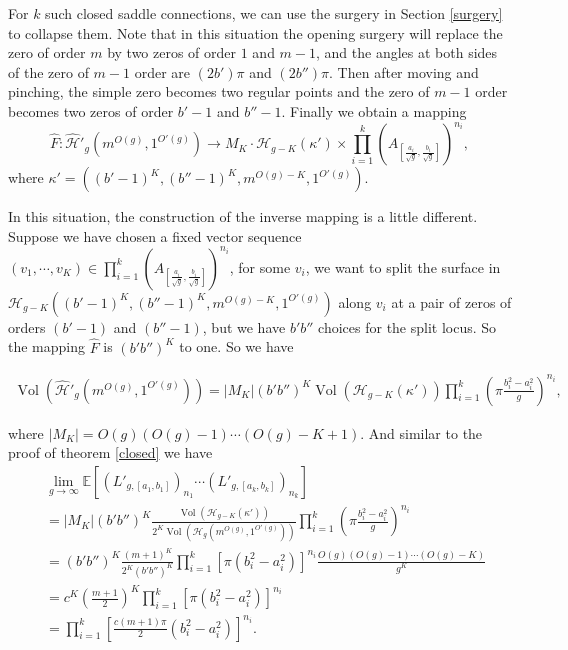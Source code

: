 \documentclass[12pt]{amsart} %
\theoremstyle{definition}
\theoremstyle{remark}
\numberwithin{equation}{section}
\renewcommand\H{{\mathcal H}}
\newcommand{\V}{\operatorname{Vol}}
\begin{document}
For $k$ such closed saddle connections, we can use the surgery in Section \ref{surgery} to collapse them. 
Note that in this situation the opening surgery will replace the zero of order $m$ by two zeros of order $1$ and $m-1$, 
and the angles at both sides of the zero of $m-1$ order are $(2b')\pi$ and $(2b'')\pi$. Then after moving and pinching, 
the simple zero becomes two regular points and the zero of $m-1$ order becomes two zeros of order $b'-1$ and $b''-1$.
Finally we obtain a mapping
$$\hat{F}: \hat{\mathcal{H}}'_{g}(m^{O(g)},1^{O'(g)})\to M_K\cdot \H_{g-K}(\kappa')\times \prod^k_{i=1} (A_{[\frac{a_i}{\sqrt{g}},\frac{b_i}{\sqrt{g}}]})^{n_i},$$
where $\kappa'=((b'-1)^K,(b''-1)^K,m^{O(g)-K},1^{O'(g)})$.

In this situation, the construction of the inverse mapping is a little different.
Suppose we have chosen a fixed vector sequence $(v_1,\cdots,v_K)\in \prod^k_{i=1} (A_{[\frac{a_i}{\sqrt{g}},\frac{b_i}{\sqrt{g}}]})^{n_i}$, 
for some $v_i$, we want to split the surface in $\H_{g-K}((b'-1)^K,(b''-1)^K,m^{O(g)-K},1^{O'(g)})$ along $v_i$ at a pair of zeros of orders $(b'-1)$ and $(b''-1)$,
but we have $b'b''$ choices for the split locus. So the mapping $\hat{F}$ is $(b'b'')^K$ to one.
So we have


\begin{equation*}
\begin{aligned}
\V(\hat{\mathcal{H}}'_{g}(m^{O(g)},1^{O'(g)}))=|M_K|(b'b'')^K \V(\H_{g-K}(\kappa'))\prod^k_{i=1}(\pi \frac{b_i^2-a_i^2}{g})^{n_i},
\end{aligned}
\end{equation*}

where $|M_K|=O(g)(O(g)-1)\cdots(O(g)-K+1)$.
And similar to the proof of theorem \ref{closed} we have
\begin{equation*}
\begin{aligned}
&\lim_{g\to \infty}\mathbb{E}[(L'_{g,[a_1,b_1]})_{n_1}\cdots (L'_{g,[a_k,b_k]})_{n_k}]
\\&=|M_K|(b'b'')^K\frac{\V(\H_{g-K}(\kappa'))}{2^K\V(\H_g(m^{O(g)},1^{O'(g)}))}\prod^k_{i=1}(\pi \frac{b_i^2-a_i^2}{g})^{n_i}
\\&=(b'b'')^K \frac{(m+1)^K}{2^K(b'b'')^K} \prod^k_{i=1}[\pi(b_i^2-a_i^2)]^{n_i}\frac{O(g)(O(g)-1)\cdots(O(g)-K)}{g^K}
\\&=c^K(\frac{m+1}{2})^K\prod^k_{i=1}[\pi(b_i^2-a_i^2)]^{n_i}
\\&=\prod^k_{i=1}[\frac{c(m+1)\pi}{2}(b_i^2-a_i^2)]^{n_i}.
\end{aligned}
\end{equation*}
\end{document}
